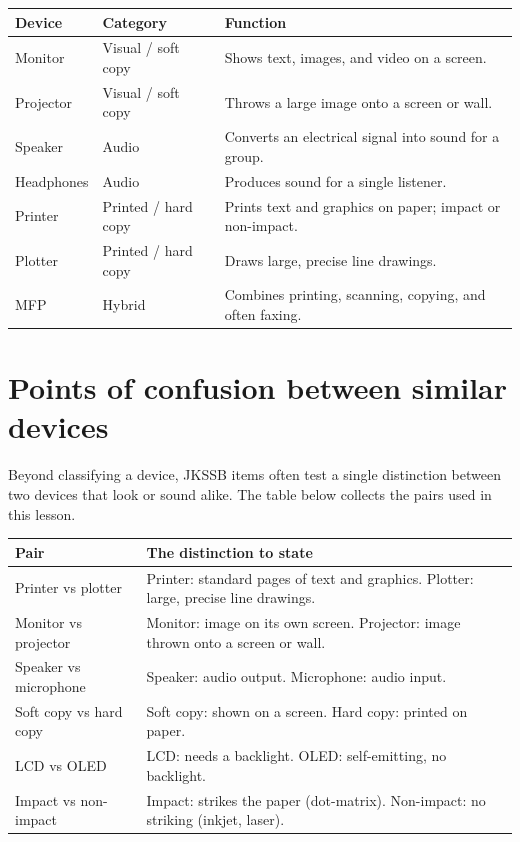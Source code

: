 \begin{center}
\begin{tabular}{p{}p{}p{}}
\toprule
\textbf{Device} & \textbf{Category} & \textbf{Function} \\
\midrule
Monitor & Visual / soft copy & Shows text, images, and video on a screen. \\
Projector & Visual / soft copy & Throws a large image onto a screen or wall. \\
Speaker & Audio & Converts an electrical signal into sound for a group. \\
Headphones & Audio & Produces sound for a single listener. \\
Printer & Printed / hard copy & Prints text and graphics on paper; impact or non-impact. \\
Plotter & Printed / hard copy & Draws large, precise line drawings. \\
MFP & Hybrid & Combines printing, scanning, copying, and often faxing. \\
\bottomrule
\end{tabular}
\end{center}

\section{Points of confusion between similar devices}
Beyond classifying a device, JKSSB items often test a single distinction
between two devices that look or sound alike. The table below collects the
pairs used in this lesson.

\begin{center}
\begin{tabular}{p{}p{}}
\toprule
\textbf{Pair} & \textbf{The distinction to state} \\
\midrule
Printer vs plotter & Printer: standard pages of text and graphics. Plotter: large, precise line drawings. \\
Monitor vs projector & Monitor: image on its own screen. Projector: image thrown onto a screen or wall. \\
Speaker vs microphone & Speaker: audio output. Microphone: audio input. \\
Soft copy vs hard copy & Soft copy: shown on a screen. Hard copy: printed on paper. \\
LCD vs OLED & LCD: needs a backlight. OLED: self-emitting, no backlight. \\
Impact vs non-impact & Impact: strikes the paper (dot-matrix). Non-impact: no striking (inkjet, laser). \\
\bottomrule
\end{tabular}
\end{center}

